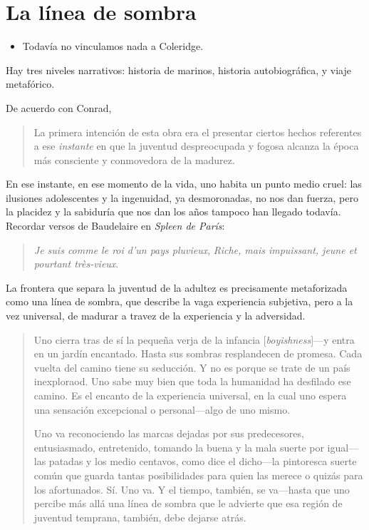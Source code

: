 \documentclass[a4paper, 12pt]{article}
\begin{document}
\section*{La línea de sombra}

\begin{itemize}
    \item Todavía no vinculamos nada a Coleridge.
\end{itemize}

Hay tres niveles narrativos: historia de marinos, historia autobiográfica, y
viaje metafórico. 

De acuerdo con Conrad, 

\begin{quote}
    La primera intención de esta obra era el presentar ciertos hechos referentes
    a ese \textit{instante} en que la juventud despreocupada y fogosa alcanza la
    época más consciente y conmovedora de la madurez.
\end{quote}

En ese instante, en ese momento de la vida, uno habita un punto medio cruel: las
ilusiones adolescentes y la ingenuidad, ya desmoronadas, no nos dan fuerza, pero
la placidez y la sabiduría que nos dan los años tampoco han llegado todavía.
Recordar versos de Baudelaire en \textit{Spleen de París}:

\begin{quote}
    \textit{Je suis comme le roi d'un pays pluvieux},\newline
    \textit{Riche, mais impuissant, jeune et pourtant très-vieux}.
\end{quote}

La frontera que separa la juventud de la adultez es precisamente metaforizada
como una línea de sombra, que describe la vaga experiencia subjetiva, pero a la
vez universal, de madurar a travez de la experiencia y la adversidad. 


\begin{quote}
    Uno cierra tras de sí la pequeña verja de la infancia
    [\textit{boyishness}]---y entra en un jardín encantado. Hasta sus sombras
    resplandecen de promesa. Cada vuelta del camino tiene su seducción. Y no es
    porque se trate de un país inexploraod. Uno sabe muy bien que toda la
    humanidad ha desfilado ese camino. Es el encanto de la experiencia
    universal, en la cual uno espera una sensación excepcional o personal---algo
    de uno mismo.

    Uno va reconociendo las marcas dejadas por sus predecesores, entusiasmado,
    entretenido, tomando la buena y la mala suerte por igual---las patadas y los
    medio centavos, como dice el dicho---la pintoresca suerte común que guarda
    tantas posibilidades para quien las merece o quizás para los afortunados.
    Sí. Uno va. Y el tiempo, también, se va---hasta que uno percibe más allá una
    línea de sombra que le advierte que esa región de juventud temprana,
    también, debe dejarse atrás.
\end{quote}
\end{document}
